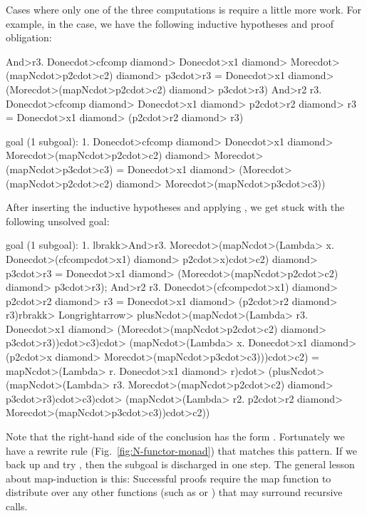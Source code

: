 Cases where only one of the three computations is  require a little more work. For example, in the  case, we have the following inductive hypotheses and proof obligation:
%
\begin{isacode}
  \<And>r3. Done\<cdot>cfcomp \<diamond> Done\<cdot>x1 \<diamond> More\<cdot>(mapN\<cdot>p2\<cdot>c2) \<diamond> p3\<cdot>r3 =
    Done\<cdot>x1 \<diamond> (More\<cdot>(mapN\<cdot>p2\<cdot>c2) \<diamond> p3\<cdot>r3)
  \<And>r2 r3. Done\<cdot>cfcomp \<diamond> Done\<cdot>x1 \<diamond> p2\<cdot>r2 \<diamond> r3 = Done\<cdot>x1 \<diamond> (p2\<cdot>r2 \<diamond> r3)
\end{isacode}
\pagebreak
\begin{isacode}
goal (1 subgoal):
 1. Done\<cdot>cfcomp \<diamond> Done\<cdot>x1 \<diamond> More\<cdot>(mapN\<cdot>p2\<cdot>c2) \<diamond> More\<cdot>(mapN\<cdot>p3\<cdot>c3) =
    Done\<cdot>x1 \<diamond> (More\<cdot>(mapN\<cdot>p2\<cdot>c2) \<diamond> More\<cdot>(mapN\<cdot>p3\<cdot>c3))
\end{isacode}
%
After inserting the inductive hypotheses and applying , we get stuck with the following unsolved goal:
%
\begin{isacode}
goal (1 subgoal):
 1. \<lbrakk>\<And>r3. More\<cdot>(mapN\<cdot>(\<Lambda> x. Done\<cdot>(cfcomp\<cdot>x1) \<diamond> p2\<cdot>x)\<cdot>c2) \<diamond> p3\<cdot>r3 =
         Done\<cdot>x1 \<diamond> (More\<cdot>(mapN\<cdot>p2\<cdot>c2) \<diamond> p3\<cdot>r3);
     \<And>r2 r3. Done\<cdot>(cfcomp\<cdot>x1) \<diamond> p2\<cdot>r2 \<diamond> r3 = Done\<cdot>x1 \<diamond> (p2\<cdot>r2 \<diamond> r3)\<rbrakk>
    \<Longrightarrow> plusN\<cdot>(mapN\<cdot>(\<Lambda> r3. Done\<cdot>x1 \<diamond> (More\<cdot>(mapN\<cdot>p2\<cdot>c2) \<diamond> p3\<cdot>r3))\<cdot>c3)\<cdot>
       (mapN\<cdot>(\<Lambda> x. Done\<cdot>x1 \<diamond> (p2\<cdot>x \<diamond> More\<cdot>(mapN\<cdot>p3\<cdot>c3)))\<cdot>c2) =
       mapN\<cdot>(\<Lambda> r. Done\<cdot>x1 \<diamond> r)\<cdot>
       (plusN\<cdot>(mapN\<cdot>(\<Lambda> r3. More\<cdot>(mapN\<cdot>p2\<cdot>c2) \<diamond> p3\<cdot>r3)\<cdot>c3)\<cdot>
        (mapN\<cdot>(\<Lambda> r2. p2\<cdot>r2 \<diamond> More\<cdot>(mapN\<cdot>p3\<cdot>c3))\<cdot>c2))
\end{isacode}
%
Note that the right-hand side of the conclusion has the form . Fortunately we have a rewrite rule  (Fig.~\ref{fig:N-functor-monad}) that matches this pattern. If we back up and try , then the subgoal is discharged in one step. The general lesson about map-induction is this: Successful proofs require the map function to distribute over any other functions (such as  or ) that may surround recursive calls.

